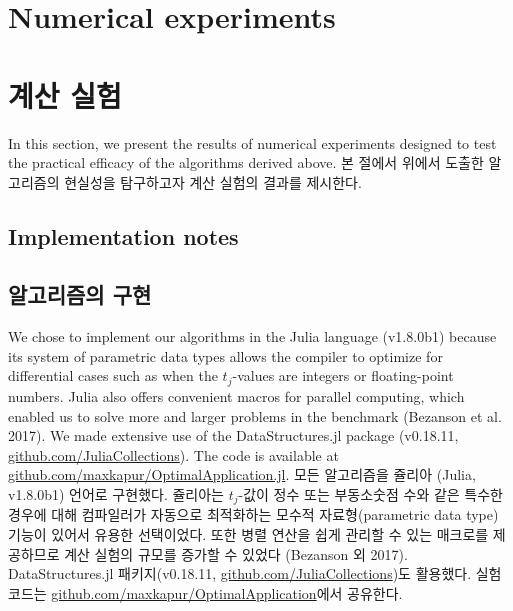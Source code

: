 \documentclass[11pt]{article} %
\theoremstyle{definition}
\theoremstyle{definition}
\begin{document}




\ifen \section{Numerical experiments} \else \section{계산 실험}\fi\label{numericalexperiments}
\ifen
In this section, we present the results of numerical experiments designed to test the practical efficacy of the algorithms derived above. 
\else
본 절에서 위에서 도출한 알고리즘의 현실성을 탐구하고자 계산 실험의 결과를 제시한다.
\fi

\ifen \subsection{Implementation notes} \else \subsection{알고리즘의 구현}\fi
\ifen
We chose to implement our algorithms in the Julia language (v1.8.0b1) because its system of parametric data types allows the compiler to optimize for differential cases such as when the $t_j$-values are integers or floating-point numbers. Julia also offers convenient macros for parallel computing, which enabled us to solve more and larger problems in the benchmark (Bezanson et al. 2017). We made extensive use of the DataStructures.jl package (v0.18.11, \url{github.com/JuliaCollections}). The code is available at \url{github.com/maxkapur/OptimalApplication.jl}. %
\else
모든 알고리즘을 쥴리아 (Julia, v1.8.0b1) 언어로 구현했다. 쥴리아는 $t_j$-값이 정수 또는 부동소숫점 수와 같은 특수한 경우에 대해 컴파일러가 자동으로 최적화하는 모수적 자료형(parametric data type) 기능이 있어서 유용한 선택이었다. 또한 병렬 연산을 쉽게 관리할 수 있는 매크로를 제공하므로 계산 실험의 규모를 증가할 수 있었다 (Bezanson 외 2017). DataStructures.jl 패키지(v0.18.11, \url{github.com/JuliaCollections})도 활용했다. 실험 코드는  \url{github.com/maxkapur/OptimalApplication}에서 공유한다.
\fi
\end{document}

